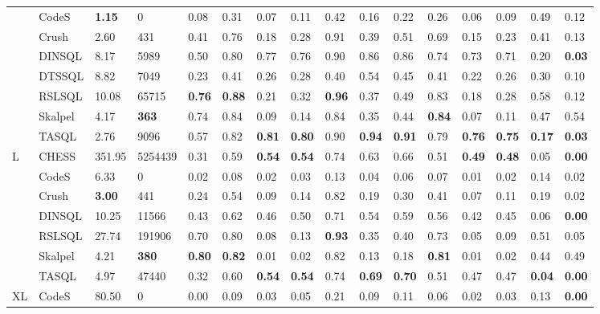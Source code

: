 \begin{table*}
\begin{tabular}{llllllllllllllll}
 & CodeS & \textbf{1.15} & 0 & 0.08 & 0.31 & 0.07 & 0.11 & 0.42 & 0.16 & 0.22 & 0.26 & 0.06 & 0.09 & 0.49 & 0.12 \\
 & Crush & 2.60 & 431 & 0.41 & 0.76 & 0.18 & 0.28 & 0.91 & 0.39 & 0.51 & 0.69 & 0.15 & 0.23 & 0.41 & 0.13 \\
 & DINSQL & 8.17 & 5989 & 0.50 & 0.80 & 0.77 & 0.76 & 0.90 & 0.86 & 0.86 & 0.74 & 0.73 & 0.71 & 0.20 & \textbf{0.03} \\
 & DTSSQL & 8.82 & 7049 & 0.23 & 0.41 & 0.26 & 0.28 & 0.40 & 0.54 & 0.45 & 0.41 & 0.22 & 0.26 & 0.30 & 0.10 \\
 & RSLSQL & 10.08 & 65715 & \textbf{0.76} & \textbf{0.88} & 0.21 & 0.32 & \textbf{0.96} & 0.37 & 0.49 & 0.83 & 0.18 & 0.28 & 0.58 & 0.12 \\
 & Skalpel & 4.17 & \textbf{363} & 0.74 & 0.84 & 0.09 & 0.14 & 0.84 & 0.35 & 0.44 & \textbf{0.84} & 0.07 & 0.11 & 0.47 & 0.54 \\
 & TASQL & 2.76 & 9096 & 0.57 & 0.82 & \textbf{0.81} & \textbf{0.80} & 0.90 & \textbf{0.94} & \textbf{0.91} & 0.79 & \textbf{0.76} & \textbf{0.75} & \textbf{0.17} & \textbf{0.03} \\
\cline{1-16}
\multirow[t]{7}{*}{L} & CHESS & 351.95 & 5254439 & 0.31 & 0.59 & \textbf{0.54} & \textbf{0.54} & 0.74 & 0.63 & 0.66 & 0.51 & \textbf{0.49} & \textbf{0.48} & 0.05 & \textbf{0.00} \\
 & CodeS & 6.33 & 0 & 0.02 & 0.08 & 0.02 & 0.03 & 0.13 & 0.04 & 0.06 & 0.07 & 0.01 & 0.02 & 0.14 & 0.02 \\
 & Crush & \textbf{3.00} & 441 & 0.24 & 0.54 & 0.09 & 0.14 & 0.82 & 0.19 & 0.30 & 0.41 & 0.07 & 0.11 & 0.19 & 0.02 \\
 & DINSQL & 10.25 & 11566 & 0.43 & 0.62 & 0.46 & 0.50 & 0.71 & 0.54 & 0.59 & 0.56 & 0.42 & 0.45 & 0.06 & \textbf{0.00} \\
 & RSLSQL & 27.74 & 191906 & 0.70 & 0.80 & 0.08 & 0.13 & \textbf{0.93} & 0.35 & 0.40 & 0.73 & 0.05 & 0.09 & 0.51 & 0.05 \\
 & Skalpel & 4.21 & \textbf{380} & \textbf{0.80} & \textbf{0.82} & 0.01 & 0.02 & 0.82 & 0.13 & 0.18 & \textbf{0.81} & 0.01 & 0.02 & 0.44 & 0.49 \\
 & TASQL & 4.97 & 47440 & 0.32 & 0.60 & \textbf{0.54} & \textbf{0.54} & 0.74 & \textbf{0.69} & \textbf{0.70} & 0.51 & 0.47 & 0.47 & \textbf{0.04} & \textbf{0.00} \\
\cline{1-16}
\multirow[t]{6}{*}{XL} & CodeS & 80.50 & 0 & 0.00 & 0.09 & 0.03 & 0.05 & 0.21 & 0.09 & 0.11 & 0.06 & 0.02 & 0.03 & 0.13 & \textbf{0.00} \\

\end{tabular}
\end{table*}

